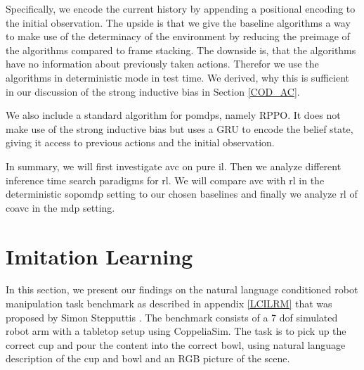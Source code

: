 Specifically, we encode the current history by appending a positional encoding to the initial observation. The upside is that we give 
the baseline algorithms a way to make use of the determinacy of the environment by reducing the preimage of the algorithms compared to 
frame stacking. The downside is, that the algorithms have no information about previously taken actions. Therefor we use the 
algorithms in deterministic mode in test time. We derived, why this is sufficient in our discussion of the strong inductive bias in 
Section \ref{COD_AC}.

We also include a standard algorithm for \ac{pomdp}s, namely RPPO. It does not make use of the strong inductive bias but uses a GRU 
to encode the belief state, giving it access to previous actions and the initial observation.


In summary, we will first investigate \ac{avc} on pure \ac{il}. Then we analyze different inference time search 
paradigms for \ac{rl}. We will compare \ac{avc} with \ac{rl} in the deterministic \ac{sopomdp} setting to our chosen baselines and finally we analyze 
\ac{rl} of \ac{coavc} in the \ac{mdp} setting.


\section{Imitation Learning}
\label{sec:exp_imi_lr}
In this section, we present our findings on the natural language conditioned robot manipulation task benchmark as described in appendix \ref{LCILRM} that was proposed by 
Simon Stepputtis \etAl \cite{stepputtis2020languageconditioned}. The benchmark consists of a 7 dof simulated robot arm with a 
tabletop setup using CoppeliaSim. The task is to pick 
up the correct cup and pour the content into the correct bowl, using natural language description of the cup and bowl and an RGB 
picture of the scene.

